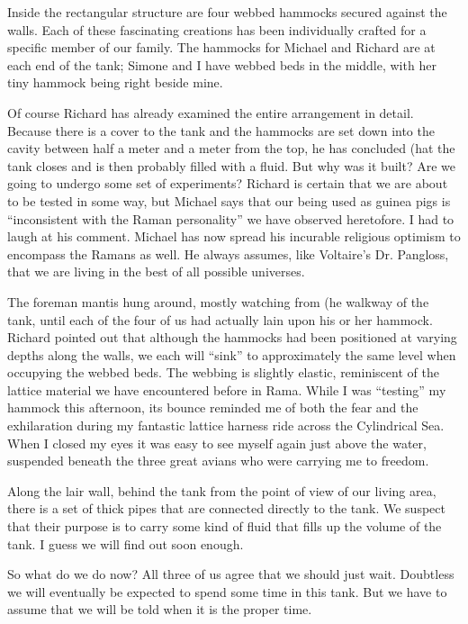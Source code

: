 \documentclass[]{article}
\begin{document}
Inside the rectangular structure are four webbed hammocks secured against the walls.  Each of these fascinating creations has been individually crafted for a specific member of our family.  The hammocks for Michael and Richard are at each end of the tank; Simone and I have webbed beds in the middle, with her tiny hammock being right beside mine.

Of course Richard has already examined the entire arrangement in detail.  Because there is a cover to the tank and the hammocks are set down into the cavity between half a meter and a meter from the top, he has concluded (hat the tank closes and is then probably filled with a fluid.  But why was it built? Are we going to undergo some set of experiments? Richard is certain that we are about to be tested in some way, but Michael says that our being used as guinea pigs is “inconsistent with the Raman personality” we have observed heretofore.  I had to laugh at his comment.  Michael has now spread his incurable religious optimism to encompass the Ramans as well.  He always assumes, like Voltaire’s Dr.  Pangloss, that we are living in the best of all possible universes.

The foreman mantis hung around, mostly watching from (he walkway of the tank, until each of the four of us had actually lain upon his or her hammock.  Richard pointed out that although the hammocks had been positioned at varying depths along the walls, we each will “sink” to approximately the same level when occupying the webbed beds.  The webbing is slightly elastic, reminiscent of the lattice material we have encountered before in Rama.  While I was “testing” my hammock this afternoon, its bounce reminded me of both the fear and the exhilaration during my fantastic lattice harness ride across the Cylindrical Sea.  When I closed my eyes it was easy to see myself again just above the water, suspended beneath the three great avians who were carrying me to freedom.

Along the lair wall, behind the tank from the point of view of our living area, there is a set of thick pipes that are connected directly to the tank.  We suspect that their purpose is to carry some kind of fluid that fills up the volume of the tank.  I guess we will find out soon enough.

So what do we do now? All three of us agree that we should just wait.  Doubtless we will eventually be expected to spend some time in this tank.  But we have to assume that we will be told when it is the proper time.
\end{document}

